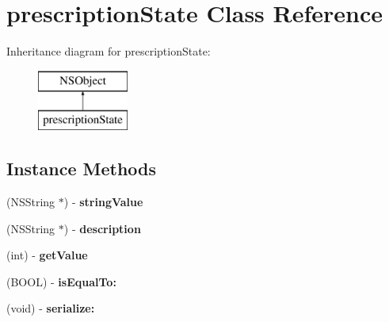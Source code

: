 \hypertarget{interfaceprescription_state}{}\section{prescription\+State Class Reference}
\label{interfaceprescription_state}
Inheritance diagram for prescription\+State\+:\begin{figure}[H]
\begin{center}
\leavevmode
\includegraphics[height=2.000000cm]{interfaceprescription_state}
\end{center}
\end{figure}
\subsection*{Instance Methods}
\begin{DoxyCompactItemize}
\item 
\hypertarget{interfaceprescription_state_ac1a6d92cbf5bfd8c0a0905022dc19ec9}{}(N\+S\+String $\ast$) -\/ {\bfseries string\+Value}\label{interfaceprescription_state_ac1a6d92cbf5bfd8c0a0905022dc19ec9}

\item 
\hypertarget{interfaceprescription_state_ad600e7cce6c8e8518158ba726c14bd61}{}(N\+S\+String $\ast$) -\/ {\bfseries description}\label{interfaceprescription_state_ad600e7cce6c8e8518158ba726c14bd61}

\item 
\hypertarget{interfaceprescription_state_a775628dae222dc47c8683dd173115868}{}(int) -\/ {\bfseries get\+Value}\label{interfaceprescription_state_a775628dae222dc47c8683dd173115868}

\item 
\hypertarget{interfaceprescription_state_a7ea06f73d782bc48bc747eea0c4d63c5}{}(B\+O\+O\+L) -\/ {\bfseries is\+Equal\+To\+:}\label{interfaceprescription_state_a7ea06f73d782bc48bc747eea0c4d63c5}

\item 
\hypertarget{interfaceprescription_state_affd99d509476ab4938fdd4d630c6af3d}{}(void) -\/ {\bfseries serialize\+:}\label{interfaceprescription_state_affd99d509476ab4938fdd4d630c6af3d}

\end{DoxyCompactItemize}
